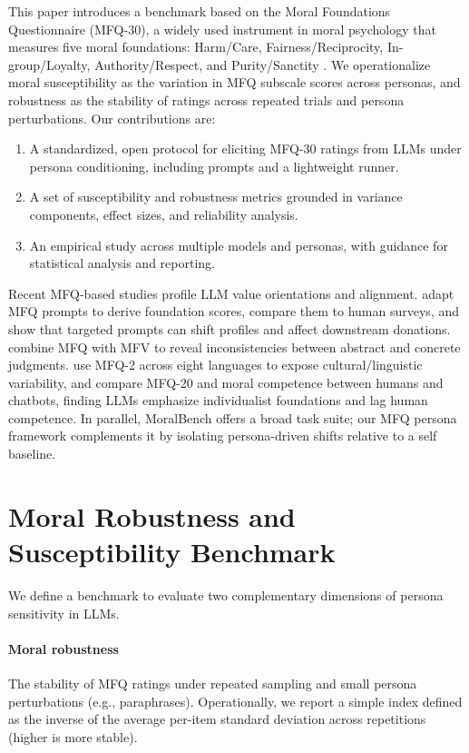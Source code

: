 \documentclass{article}
\begin{document}
This paper introduces a benchmark based on the Moral Foundations Questionnaire (MFQ-30), a widely used instrument in moral psychology that measures five moral foundations: Harm/Care, Fairness/Reciprocity, In-group/Loyalty, Authority/Respect, and Purity/Sanctity \citep{graham2009liberals,haidt2007when}. We operationalize moral susceptibility as the variation in MFQ subscale scores across personas, and robustness as the stability of ratings across repeated trials and persona perturbations. Our contributions are:
\begin{enumerate}
  \item A standardized, open protocol for eliciting MFQ-30 ratings from LLMs under persona conditioning, including prompts and a lightweight runner.
  \item A set of susceptibility and robustness metrics grounded in variance components, effect sizes, and reliability analysis.
  \item An empirical study across multiple models and personas, with guidance for statistical analysis and reporting.
\end{enumerate}

Recent MFQ-based studies profile LLM value orientations and alignment. \citet{abdulhai-etal-2024-moral} adapt MFQ prompts to derive foundation scores, compare them to human surveys, and show that targeted prompts can shift profiles and affect downstream donations. \citet{nunes2024hypocrites} combine MFQ with MFV to reveal inconsistencies between abstract and concrete judgments. \citet{aksoy2024whose} use MFQ-2 across eight languages to expose cultural/linguistic variability, and \citet{bajpai2024insights} compare MFQ-20 and moral competence between humans and chatbots, finding LLMs emphasize individualist foundations and lag human competence. In parallel, MoralBench \citep{ji2025moralbenchmoralevaluationllms} offers a broad task suite; our MFQ persona framework complements it by isolating persona-driven shifts relative to a self baseline.

\section{Moral Robustness and Susceptibility Benchmark}
We define a benchmark to evaluate two complementary dimensions of persona sensitivity in LLMs.

\paragraph{Moral robustness} The stability of MFQ ratings under repeated sampling and small persona perturbations (e.g., paraphrases). Operationally, we report a simple index defined as the inverse of the average per-item standard deviation across repetitions (higher is more stable).
\end{document}
